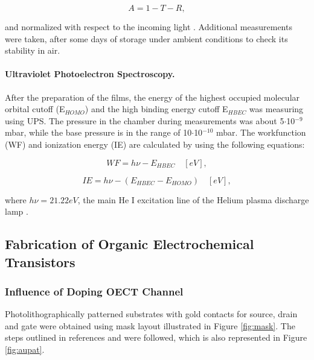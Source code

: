 \begin{equation}\label{eq:abs}
	A = 1 - T - R,
\end{equation}

and normalized with respect to the incoming light \cite{uvvis}. Additional measurements were taken, after some days of storage under ambient conditions to check its stability in air.

\paragraph{Ultraviolet Photoelectron Spectroscopy.}After the preparation of the films, %
the energy of the highest occupied molecular orbital cutoff (E$_{HOMO}$) and the high binding energy cutoff E$_{HBEC}$ was measuring using UPS. The pressure in the chamber during measurements was about 5$\cdot$10$^{-9}$ mbar, while the base pressure is in the range of 10$\cdot$10$^{-10}$ mbar. The workfunction (WF) and ionization energy (IE) are calculated by using the following equations:

\begin{equation}\label{eq:wf}
	WF = h\nu - E_{HBEC} \quad [eV],
\end{equation}

\begin{equation}\label{eq:ie}
	IE = h\nu - (E_{HBEC}-E_{HOMO}) \quad [eV],
\end{equation}

where $h\nu = 21.22 eV$, the main He I excitation line of the Helium plasma discharge lamp \cite{buchholtzDopingPropertiesNovel2021}. 
 

\subsection{Fabrication of Organic Electrochemical Transistors}

\subsubsection{Influence of Doping OECT Channel} \label{subsec:photo}

Photolithographically patterned substrates with gold contacts for source, drain and gate were obtained using mask layout illustrated in Figure \ref{fig:mask}. The steps outlined in references \cite{weissbachPhotopatternableSolidElectrolyte2022} and \cite{bongartzOrganicElectrochemicalTransistors2021} were followed, which is also represented in Figure \ref{fig:aupat}.


